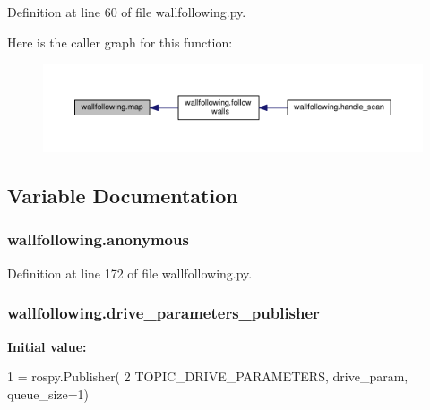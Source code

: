 Definition at line 60 of file wallfollowing.\+py.



Here is the caller graph for this function\+:
\nopagebreak
\begin{figure}[H]
\begin{center}
\leavevmode
\includegraphics[width=350pt]{namespacewallfollowing_a908b60b64e20dec7078e707a829b610d_icgraph}
\end{center}
\end{figure}




\subsection{Variable Documentation}
\subsubsection[{\texorpdfstring{anonymous}{anonymous}}]{\setlength{\rightskip}{0pt plus 5cm}wallfollowing.\+anonymous}\hypertarget{namespacewallfollowing_a005968f85117845c036ef1cbd61034bb}{}\label{namespacewallfollowing_a005968f85117845c036ef1cbd61034bb}


Definition at line 172 of file wallfollowing.\+py.

\subsubsection[{\texorpdfstring{drive\+\_\+parameters\+\_\+publisher}{drive_parameters_publisher}}]{\setlength{\rightskip}{0pt plus 5cm}wallfollowing.\+drive\+\_\+parameters\+\_\+publisher}\hypertarget{namespacewallfollowing_aa69138defbbc5f21e99db50a6b3c903f}{}\label{namespacewallfollowing_aa69138defbbc5f21e99db50a6b3c903f}
{\bfseries Initial value\+:}
\begin{DoxyCode}
1 = rospy.Publisher(
2     TOPIC\_DRIVE\_PARAMETERS, drive\_param, queue\_size=1)
\end{DoxyCode}



